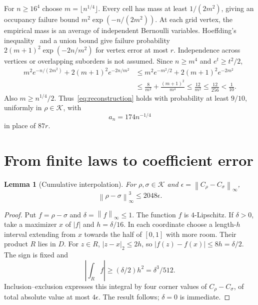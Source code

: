 \documentclass[11pt]{article}
\newtheorem{lemma}[theorem]{Lemma}
\theoremstyle{remark}
\newcommand{\K}{\mathcal K}
\newcommand{\norm}[1]{\left\lVert #1\right\rVert_\infty}
\begin{document}
For $n\ge16^4$ choose $m=\lfloor n^{1/4}\rfloor$. Every cell has
mass at least $1/(2m^2)$, giving an occupancy failure bound
$m^2\exp(-n/(2m^2))$. At each grid vertex, the empirical mass is an
average of independent Bernoulli variables. Hoeffding's
inequality~\cite{Hoeffding} and a union bound give failure probability
$2(m+1)^2\exp(-2n/m^2)$ for vertex error at most $r$.
Independence across vertices or overlapping suborders is not assumed.
Since $n\ge m^4$ and $e^t\ge t^2/2$,
\begin{align*}
 m^2e^{-n/(2m^2)}+2(m+1)^2e^{-2n/m^2}
 &\le m^2e^{-m^2/2}+2(m+1)^2e^{-2m^2}\\
 &\le\frac8{m^2}+\frac{(m+1)^2}{m^4}
 \le\frac{12}{m^2}\le\frac{12}{256}<\frac1{10}.
\end{align*}
Also $m\ge n^{1/4}/2$. Thus~\eqref{eq:reconstruction} holds with
probability at least $9/10$, uniformly in $\rho\in\K$, with
\begin{equation}\label{eq:an}
 a_n=174n^{-1/4}
\end{equation}
in place of $87r$.

\section{From finite laws to coefficient error}\label{sec:inverse}
\begin{lemma}[Cumulative interpolation]\label{lem:interpolation}
For $\rho,\sigma\in\K$ and $\epsilon=\norm{C_\rho-C_\sigma}$,
\[
 \norm{\rho-\sigma}^3\le2048\epsilon.
\]
\end{lemma}
\begin{proof}
Put $f=\rho-\sigma$ and $\delta=\norm f\le1$. The function $f$ is
$4$-Lipschitz. If $\delta>0$, take a maximizer $x$ of $|f|$ and
$h=\delta/16$. In each coordinate choose a length-$h$ interval
extending from $x$ towards the half of $[0,1]$ with more room.
Their product $R$ lies in $D$. For $z\in R$,
$|z-x|_2\le2h$, so $|f(z)-f(x)|\le8h=\delta/2$.
The sign is fixed and
\[
 \left|\int_R f\right|\ge(\delta/2)h^2=\delta^3/512.
\]
Inclusion--exclusion expresses this integral by four corner values
of $C_\rho-C_\sigma$, of total absolute value at most $4\epsilon$.
The result follows; $\delta=0$ is immediate.
\end{proof}
\end{document}
